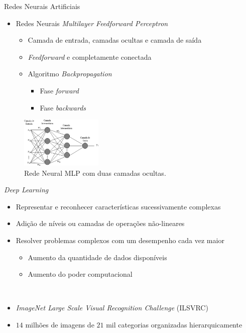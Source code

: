 \begin{frame}{Redes Neurais Artificiais}
   \ \  \\[0.1cm]
   \begin{itemize}
        \item Redes Neurais \alert{\emph{Multilayer Feedforward Perceptron}}
        \begin{itemize}
          \item Camada de entrada, camadas ocultas e camada de saída
          \item \emph{Feedforward} e completamente conectada
          \item Algoritmo \emph{Backpropagation}
          \begin{itemize}
               \item Fase \emph{forward}
               \item Fase \emph{backwards}
          \end{itemize}
\end{itemize}
   \end{itemize}
   \begin{figure}[ht]
    \centering
    \label{fig:mlp}
    \includegraphics[width=0.35\textwidth]{img/mlprna.jpg}
     \caption{Rede Neural MLP com duas camadas ocultas.}
   \end{figure}
\end{frame}

\begin{frame}{\emph{Deep Learning}}
   \ \  \\[0.1cm]
   \begin{itemize}
     \item Representar e reconhecer características sucessivamente complexas
     \ \ \newline
     \item Adição de níveis ou camadas de operações não-lineares
     \ \ \newline
     \item Resolver problemas complexos com um desempenho cada vez maior
     \begin{itemize}
       \item Aumento da quantidade de dados disponíveis
       \item Aumento do poder computacional
     \end{itemize}
     \ \ \newline
     \item \emph{ImageNet Large Scale Visual Recognition Challenge} (ILSVRC)
     \item $14$ milhões de imagens de $21$ mil categorias organizadas hierarquicamente
   \end{itemize}
\end{frame}

